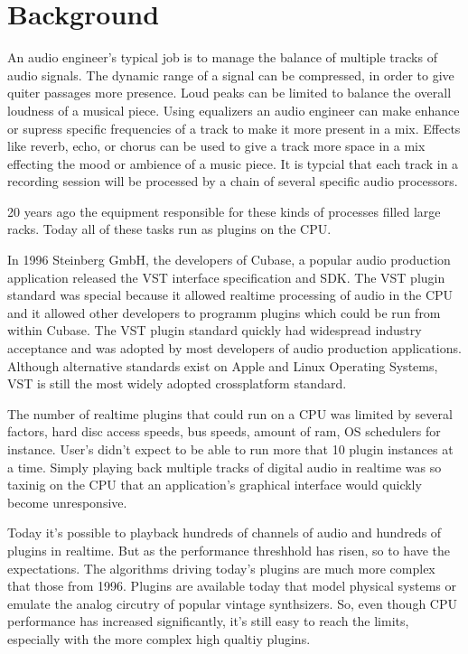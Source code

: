 \section{Background}

An audio engineer's typical job is to manage the balance of multiple tracks of audio signals. The dynamic range of a signal can be compressed, in order to give quiter passages more presence. Loud peaks can be limited to balance the overall loudness of a musical piece. Using equalizers an audio engineer can make enhance or supress specific frequencies of a track to make it more present in a mix. Effects like reverb, echo, or chorus can be used to give a track more space in a mix effecting the mood or ambience of a music piece. It is typcial that each track in a recording session will be processed by a chain of several specific audio processors.

20 years ago the equipment responsible for these kinds of processes filled large racks. Today all of these tasks run as plugins on the CPU.

In 1996 Steinberg GmbH, the developers of Cubase, a popular audio production application released the VST interface specification and SDK.\cite{VST-wikipedia} The VST plugin standard was special because it allowed realtime processing of audio in the CPU and it allowed other developers to programm plugins which could be run from within Cubase. The VST plugin standard quickly had widespread industry acceptance and was adopted by most developers of audio production applications. Although alternative standards exist on Apple and Linux Operating Systems, VST is still the most widely adopted crossplatform standard.

The number of realtime plugins that could run on a CPU was limited by several factors, hard disc access speeds, bus speeds, amount of ram, OS schedulers for instance\cite{latency98}. User's didn't expect to be able to run more that 10 plugin instances at a time. Simply playing back multiple tracks of digital audio in realtime was so taxinig on the CPU that an application's graphical interface would quickly become unresponsive.

Today it's possible to playback hundreds of channels of audio and hundreds of plugins in realtime. But as the performance threshhold has risen, so to have the expectations. The algorithms driving today's plugins are much more complex that those from 1996. Plugins are available today that model physical systems or emulate the analog circutry of popular vintage synthsizers. So, even though CPU performance has increased significantly, it's still easy to reach the limits, especially with the more complex high qualtiy plugins.

